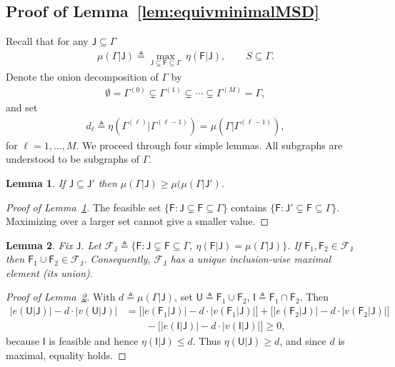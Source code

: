 \documentclass[12pt]{article}
\newtheorem{lemma}{Lemma}
\newcommand{\s}[1]{\mathsf{#1}}
\begin{document}
\subsection{Proof of Lemma~\ref{lem:equivminimalMSD}}\label{app:equiv}

Recall that for any $\s{J}\subseteq\Gamma$
\begin{align}
\mu(\Gamma\vert\s{J}) \triangleq \max_{\s{J}\subsetneq \s{F}\subseteq \Gamma}\ \eta(\s{F}\vert\s{J}),
\qquad S\subseteq\Gamma .
\end{align}
Denote the onion decomposition of $\Gamma$ by
\begin{align}
\emptyset=\Gamma^{(0)}\subsetneq\Gamma^{(1)}\subsetneq\cdots\subsetneq \Gamma^{(M)}=\Gamma,
\end{align}
and set
\begin{align}
d_\ell \triangleq \eta \left(\Gamma^{(\ell)}\vert\Gamma^{(\ell-1)}\right)=\mu(\Gamma\vert\Gamma^{(\ell-1)}),
\end{align}
for $\ell=1,\dots,M$. We proceed through four simple lemmas. All subgraphs are understood to be subgraphs of $\Gamma$.
\begin{lemma}\label{lem:APP1}
    If $\s{J}\subseteq \s{J}'$ then $\mu(\Gamma\vert\s{J})\ge \mu(\mu(\Gamma\vert\s{J}')$.
\end{lemma}
\begin{proof}[Proof of Lemma~\ref{lem:APP1}]
The feasible set $\{\s{F}:\s{J}\subsetneq \s{F}\subseteq \Gamma\}$ contains $\{\s{F}:\s{J}'\subsetneq \s{F}\subseteq \Gamma\}$. Maximizing over a larger set cannot give a smaller value.
\end{proof}
\begin{lemma}\label{lem:APP2}
Fix $\s{J}$. Let $\mathcal{F}_{\s{J}}\triangleq\{\s{F}:\s{J}\subsetneq \s{F}\subseteq\Gamma,\ \eta(\s{F}\vert \s{J})=\mu(\Gamma\vert\s{J})\}$. If $\s{F}_1,\s{F}_2\in\mathcal{F}_{\s{J}}$ then $\s{F}_1\cup \s{F}_2\in\mathcal{F}_{\s{J}}$. Consequently, $\mathcal{F}_{\s{J}}$ has a unique inclusion-wise maximal element (its union).
\end{lemma}
\begin{proof}[Proof of Lemma~\ref{lem:APP2}]
With $d\triangleq\mu(\Gamma\vert\s{J})$, set $\s{U}\triangleq\s{F}_1\cup \s{F}_2$, $\s{I}\triangleq \s{F}_1\cap \s{F}_2$. Then
\begin{align}
|e(\s{U}\vert \s{J})|-d\cdot|v(\s{U}\vert \s{J})|&=\bigl[|e(\s{F}_1\vert\s{J})|-d\cdot|v(\s{F}_1\vert \s{J})|\bigr]+\bigl[|e(\s{F}_2\vert\s{J})|-d\cdot|v(\s{F}_2\vert \s{J})|\bigr]\nonumber\\
&\qquad-\bigl[|e(\s{I}\vert \s{J})|-d\cdot|v(\s{I}\vert\s{J})|\bigr]\ge 0,
\end{align}
because $\s{I}$ is feasible and hence $\eta(\s{I}\vert\s{J})\leq d$. Thus $\eta(\s{U}\vert\s{J})\ge d$, and since $d$ is maximal, equality holds.
\end{proof}
\end{document}
